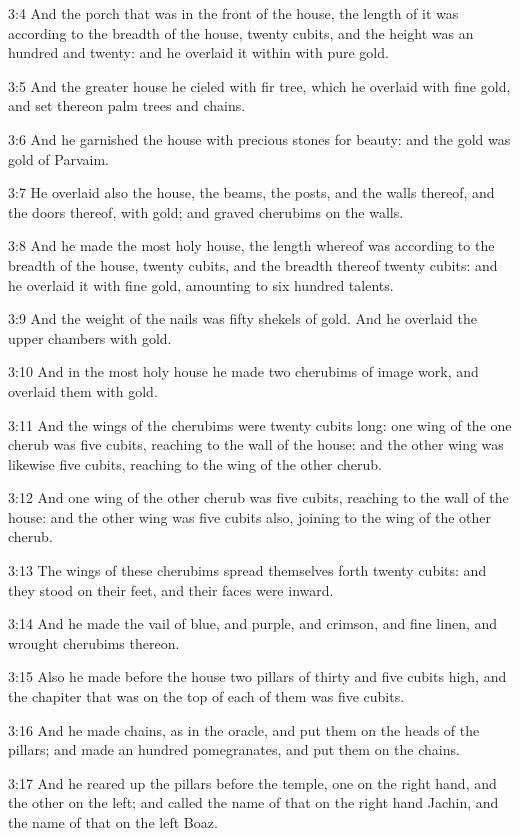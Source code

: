 3:4 And the porch that was in the front of the house, the length of it was according to the breadth of the house, twenty cubits, and the height was an hundred and twenty: and he overlaid it within with pure gold.

3:5 And the greater house he cieled with fir tree, which he overlaid with fine gold, and set thereon palm trees and chains.

3:6 And he garnished the house with precious stones for beauty: and the gold was gold of Parvaim.

3:7 He overlaid also the house, the beams, the posts, and the walls thereof, and the doors thereof, with gold; and graved cherubims on the walls.

3:8 And he made the most holy house, the length whereof was according to the breadth of the house, twenty cubits, and the breadth thereof twenty cubits: and he overlaid it with fine gold, amounting to six hundred talents.

3:9 And the weight of the nails was fifty shekels of gold. And he overlaid the upper chambers with gold.

3:10 And in the most holy house he made two cherubims of image work, and overlaid them with gold.

3:11 And the wings of the cherubims were twenty cubits long: one wing of the one cherub was five cubits, reaching to the wall of the house: and the other wing was likewise five cubits, reaching to the wing of the other cherub.

3:12 And one wing of the other cherub was five cubits, reaching to the wall of the house: and the other wing was five cubits also, joining to the wing of the other cherub.

3:13 The wings of these cherubims spread themselves forth twenty cubits: and they stood on their feet, and their faces were inward.

3:14 And he made the vail of blue, and purple, and crimson, and fine linen, and wrought cherubims thereon.

3:15 Also he made before the house two pillars of thirty and five cubits high, and the chapiter that was on the top of each of them was five cubits.

3:16 And he made chains, as in the oracle, and put them on the heads of the pillars; and made an hundred pomegranates, and put them on the chains.

3:17 And he reared up the pillars before the temple, one on the right hand, and the other on the left; and called the name of that on the right hand Jachin, and the name of that on the left Boaz.

